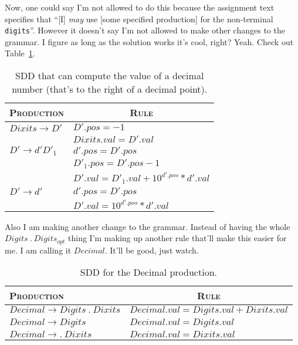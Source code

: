 Now, one could say I'm not allowed to do this because the assignment text specifies that ``[I] \emph{may} use [some specified production] for the non-terminal \texttt{digits}''.
However it doesn't say I'm not allowed to make other changes to the grammar.
I figure as long as the solution works it's cool, right?
Yeah.
Check out Table~\ref{tab:5-2}.

\begin{table}[H]
	\centering
	\begin{tabular}{l|l}
	\hline	\hline
	\textsc{Production}			& \multicolumn{1}{c}{\textsc{Rule}} \\ \hline
	$Dixits\rightarrow D'$	& $D'.pos = -1$ \\ 
							& $Dixits.val = D'.val$ \\ \hline
	$D'\rightarrow d'D'_1$	& $d'.pos = D'.pos$	\\
							& $D'_1.pos = D'.pos - 1$ \\
							& $D'.val = D'_1.val + 10^{d'.pos}*d'.val$ \\ \hline
	$D'\rightarrow d'$		& $d'.pos = D'.pos$	\\
							& $D'.val = 10^{d'.pos}*d'.val$\\

	\hline
	\end{tabular}	
	\caption{SDD that can compute the value of a decimal number (that's to the right of a decimal point).}
	\label{tab:5-2}
\end{table}

Also I am making another change to the grammar.
Instead of having the whole $Digits~.~Digits_{opt}$ thing I'm making up another rule that'll make this easier for me.
I am calling it $Decimal$.
It'll be good, just watch.

\begin{table}[H]
	\centering
	\begin{tabular}{l|l}
	\hline	\hline
	\textsc{Production}						& \multicolumn{1}{c}{\textsc{Rule}} \\ \hline
	$Decimal\rightarrow Digits~.~Dixits$	& $Decimal.val = Digits.val + Dixits.val$ \\ \hline
	$Decimal\rightarrow Digits$				& $Decimal.val = Digits.val$ \\ \hline
	$Decimal\rightarrow .~Dixits$			& $Decimal.val = Dixits.val$ \\
	\hline
	\end{tabular}	
	\caption{SDD for the Decimal production.}
	\label{tab:5-3}
\end{table}

